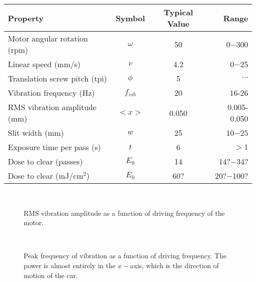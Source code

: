 \begin{tabular}{lccr}
\hline
Property & Symbol & Typical Value & Range \\
\hline
Motor angular rotation (rpm) & $\omega$ & 50 & 0$-$300 \\
Linear speed (mm/s) & $v$ & 4.2 & 0$-$25 \\
Translation screw pitch (tpi) & $\phi$ & 5 & $\cdots$ \\
Vibration frequency (Hz) & $f_{vib}$ & 20 & 16-26 \\
RMS vibration amplitude (mm) & $<x>$ & 0.050 & 0.005-0.050 \\
Slit width (mm) & $w$ & 25 & 10$-$25 \\
Exposure time per pass (s) & $t$ & 6 & $>1$ \\
Dose to clear (passes) & $E_0$ & 14 & 14?$-$34? \\
Dose to clear (mJ/cm$^2$) & $E_0$ & 60? & 20?$-$100? \\

\hline
\end{tabular}

\begin{figure}[h!] 
\begin{center}
\ 
\caption[Motor vibration amplitude]{RMS vibration amplitude as a function of driving frequency of the motor.}
\label{fig:resonantmotor}
\end{center}
\end{figure}

\begin{figure}[h!] 
\begin{center}
\ 
\caption[Motor vibration frequency]{Peak frequency of vibration as a function of driving frequency.  The power is almost entirely in the $x-$axis, which is the direction of motion of the car.}
\label{fig:freqresponse}
\end{center}
\end{figure}


